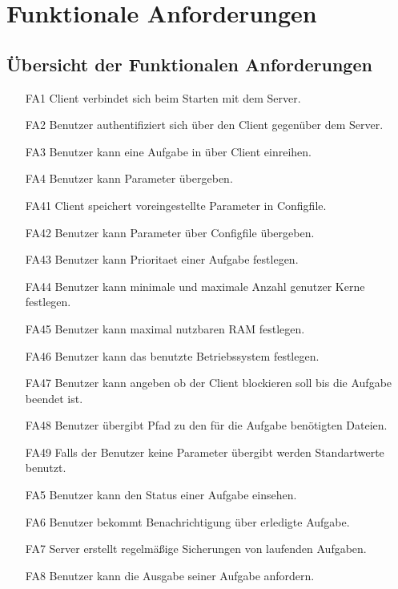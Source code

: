 \documentclass[a4paper,12pt]{article}
\begin{document}
\newpage

\newpage

\section{Funktionale Anforderungen}

\subsection{Übersicht der  Funktionalen Anforderungen}


\begin{itemize}[nosep]
\leftskip=0.5cm

\item[FA1]	\gls{Client} verbindet sich beim Starten mit dem Server.
\item[FA2] Benutzer authentifiziert sich über den \gls{Client} gegenüber dem Server.
\item[FA3] Benutzer kann eine Aufgabe in über \gls{Client} einreihen.
\item[FA4] Benutzer kann Parameter übergeben.
\item[FA41]	\gls{Client} speichert voreingestellte Parameter in \gls{Configfile}.
\item[FA42]	Benutzer kann Parameter über \gls{Configfile} übergeben.
\item[FA43] Benutzer kann \gls{Prioritaet} einer Aufgabe festlegen.
\item[FA44] Benutzer kann minimale und maximale Anzahl genutzer Kerne festlegen. %
 \item[FA45] Benutzer kann maximal nutzbaren RAM festlegen. %
\item[FA46] Benutzer kann das benutzte Betriebssystem festlegen.
\item[FA47] Benutzer kann angeben ob der \gls{Client} blockieren soll bis die Aufgabe beendet ist. %
\item[FA48] Benutzer übergibt Pfad zu den für die Aufgabe benötigten Dateien. %
\item[FA49] Falls der Benutzer keine Parameter übergibt werden Standartwerte benutzt.
\item[FA5] Benutzer kann den Status einer Aufgabe einsehen.
\item[FA6] Benutzer bekommt Benachrichtigung über erledigte Aufgabe.
\item[FA7] Server erstellt regelmäßige Sicherungen von laufenden Aufgaben.
\item[FA8] Benutzer kann die Ausgabe seiner Aufgabe anfordern.
\end{itemize}
\end{document}
